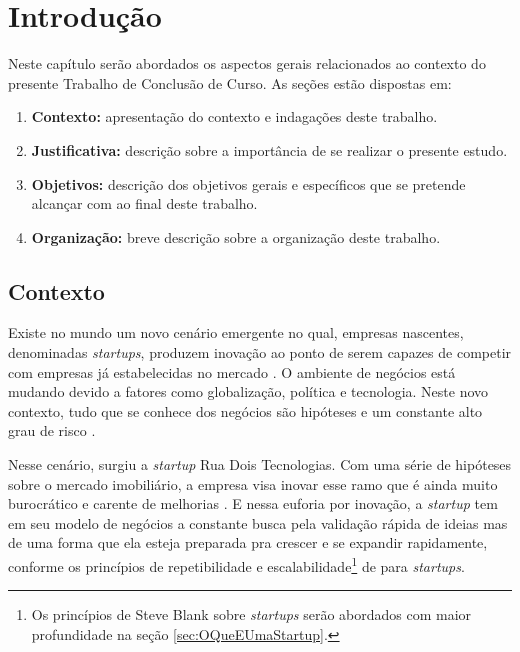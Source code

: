 \chapter[Introdução]{Introdução}

Neste capítulo serão abordados os aspectos gerais relacionados ao contexto
do presente Trabalho de Conclusão de Curso. As seções estão dispostas em:

  \begin{enumerate}
    \item \textbf{Contexto:} apresentação do contexto e indagações deste
    trabalho.
    \item \textbf{Justificativa:} descrição sobre a importância de se
    realizar o presente estudo.
    \item \textbf{Objetivos:} descrição dos objetivos gerais e específicos
    que se pretende alcançar com ao final deste trabalho.
    \item \textbf{Organização:} breve descrição sobre a organização deste
    trabalho.
  \end{enumerate}

\section{Contexto}

Existe no mundo um novo cenário emergente no qual, empresas nascentes,
denominadas \textit{startups}, produzem inovação ao ponto de serem capazes
de competir com empresas já estabelecidas no mercado \cite{CapacidadeDeInovacao}.
O ambiente de negócios está mudando devido a fatores como globalização, política
e tecnologia. Neste novo contexto, tudo que se conhece dos negócios são
hipóteses e um constante alto grau de risco \cite{Akiyoshi}.

Nesse cenário, surgiu a \textit{startup} Rua Dois Tecnologias. Com uma série
de hipóteses sobre o mercado imobiliário, a empresa visa inovar esse ramo que
é ainda muito burocrático e carente de melhorias \cite{LouisaXu}. E nessa
euforia por inovação, a \textit{startup} tem em seu modelo de negócios a
constante busca pela validação rápida de ideias mas de uma forma que ela
esteja preparada pra crescer e se expandir rapidamente, conforme os princípios
de repetibilidade e escalabilidade\footnote{Os princípios de Steve Blank sobre
\textit{startups} serão abordados com maior profundidade na seção
\ref{sec:OQueEUmaStartup}.} de  para
\textit{startups}.

